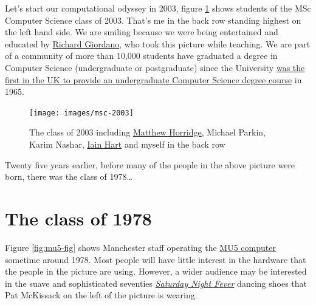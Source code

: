 \documentclass[
  12pt,
]{book}
\begin{document}
Let's start our computational odyssey in 2003, figure \ref{fig:msc-fig} shows students of the MSc Computer Science class of 2003. That's me in the back row standing highest on the left hand side. We are smiling because we were being entertained and educated by \href{https://www.southampton.ac.uk/healthsciences/about/staff/richard_giordano.page}{Richard Giordano}, who took this picture while teaching. We are part of a community of more than 10,000 students have graduated a degree in Computer Science (undergraduate or postgraduate) since the University \href{http://www.bbc.co.uk/manchester/content/articles/2005/11/07/baby_computer_40_interview_feature.shtml}{was the first in the UK to provide an undergraduate Computer Science degree course} in 1965. \citep{babygrowsup}

\begin{figure}

{\centering \texttt{[image: images/msc-2003]} 

}

\caption{The class of 2003 including \href{https://web.stanford.edu/~horridge/}{Matthew Horridge}, Michael Parkin, Karim Nashar, \href{https://staffnet.cs.manchester.ac.uk/techso/}{Iain Hart} and myself in the back row}\label{fig:msc-fig}
\end{figure}



Twenty five years earlier, before many of the people in the above picture were born, there was the class of 1978\ldots{}

\hypertarget{y1978}{%
\section{The class of 1978}\label{y1978}}

Figure \ref{fig:mu5-fig} shows Manchester staff operating the \href{https://en.wikipedia.org/wiki/Manchester_computers\#MU5}{MU5 computer} sometime around 1978. Most people will have little interest in the hardware that the people in the picture are using. However, a wider audience may be interested in the suave and sophisticated seventies \emph{\href{https://en.wikipedia.org/wiki/Saturday_Night_Fever}{Saturday Night Fever}} dancing shoes that Pat McKissack on the left of the picture is wearing. \citep{nightfever}
\end{document}
